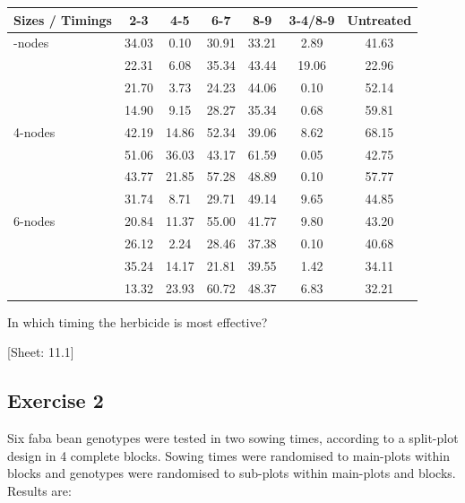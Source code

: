 \documentclass[a4paper,12pt,oneside]{book}
\begin{document}
\begin{longtable}[]{@{}lcccccc@{}}
\toprule\noalign{}
Sizes / Timings & 2-3 & 4-5 & 6-7 & 8-9 & 3-4/8-9 & Untreated \\
\midrule\noalign{}
\endhead
\bottomrule\noalign{}
\endlastfoot
2-nodes & 34.03 & 0.10 & 30.91 & 33.21 & 2.89 & 41.63 \\
& 22.31 & 6.08 & 35.34 & 43.44 & 19.06 & 22.96 \\
& 21.70 & 3.73 & 24.23 & 44.06 & 0.10 & 52.14 \\
& 14.90 & 9.15 & 28.27 & 35.34 & 0.68 & 59.81 \\
4-nodes & 42.19 & 14.86 & 52.34 & 39.06 & 8.62 & 68.15 \\
& 51.06 & 36.03 & 43.17 & 61.59 & 0.05 & 42.75 \\
& 43.77 & 21.85 & 57.28 & 48.89 & 0.10 & 57.77 \\
& 31.74 & 8.71 & 29.71 & 49.14 & 9.65 & 44.85 \\
6-nodes & 20.84 & 11.37 & 55.00 & 41.77 & 9.80 & 43.20 \\
& 26.12 & 2.24 & 28.46 & 37.38 & 0.10 & 40.68 \\
& 35.24 & 14.17 & 21.81 & 39.55 & 1.42 & 34.11 \\
& 13.32 & 23.93 & 60.72 & 48.37 & 6.83 & 32.21 \\
\end{longtable}

In which timing the herbicide is most effective?

{[}Sheet: 11.1{]}

\hypertarget{exercise-2-7}{%
\subsection{Exercise 2}\label{exercise-2-7}}

Six faba bean genotypes were tested in two sowing times, according to a split-plot design in 4 complete blocks. Sowing times were randomised to main-plots within blocks and genotypes were randomised to sub-plots within main-plots and blocks. Results are:
\end{document}
